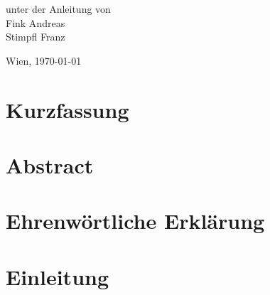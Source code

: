 \documentclass[
    headings=optiontotocandhead,%
    twoside,
    numbers=noenddot,%
    toc=flat, %
    12pt, %
    titlepage, %
    parskip=full, %
    listof=totoc, %
    listof=flat, %
    numbers=noenddot, %
    bibliography=totoc, %
    a4paper,DIV=14,
    BCOR=15mm,
]{scrbook}
\begin{document}
\begin{titlepage}
\begin{center}
\par\end{center}{\large \par}

\begin{center}
\vspace{20mm}
 \normalsize unter der Anleitung von\\
 \vspace{0.5cm}
 Fink Andreas\\
Stimpfl Franz
\par\end{center}

\begin{center}
\vspace{5mm}
Wien, \today
\par\end{center}

\end{titlepage}%

\chapter*{Kurzfassung}


\chapter*{Abstract}


\chapter*{Ehrenwörtliche Erklärung}


\cleardoublepage{}
\tableofcontents{}
\cleardoublepage{}
\listoftables
\cleardoublepage{}
\listoffigures

\cleardoublepage{}
\mainmatter


\chapter{Einleitung}\label{Einleitung}
\end{document}
